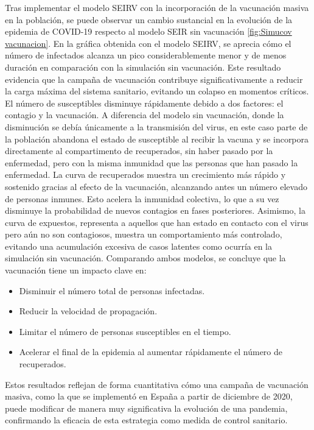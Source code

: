 Tras implementar el modelo SEIRV con la incorporación de la vacunación masiva en la población, se puede observar un cambio sustancial en la evolución de la epidemia de COVID-19 respecto al modelo SEIR sin vacunación \ref{fig:Simucov vacunacion}.
En la gráfica obtenida con el modelo SEIRV, se aprecia cómo el número de infectados alcanza un pico considerablemente menor y de menos duración en comparación con la simulación sin vacunación. Este resultado evidencia que la campaña de vacunación contribuye significativamente a reducir la carga máxima del sistema sanitario, evitando un colapso en momentos críticos.
El número de susceptibles disminuye rápidamente debido a dos factores: el contagio y la vacunación. A diferencia del modelo sin vacunación, donde la disminución se debía únicamente a la transmisión del virus, en este caso parte de la población abandona el estado de susceptible al recibir la vacuna y se incorpora directamente al compartimento de recuperados, sin haber pasado por la enfermedad, pero con la misma inmunidad que las personas que han pasado la enfermedad.
La curva de recuperados muestra un crecimiento más rápido y sostenido gracias al efecto de la vacunación, alcanzando antes un número elevado de personas inmunes. Esto acelera la inmunidad colectiva, lo que a su vez disminuye la probabilidad de nuevos contagios en fases posteriores.
Asimismo, la curva de expuestos, representa a aquellos que han estado en contacto con el virus pero aún no son contagiosos, muestra un comportamiento más controlado, evitando una acumulación excesiva de casos latentes como ocurría en la simulación sin vacunación.
Comparando ambos modelos, se concluye que la vacunación tiene un impacto clave en:
\begin{itemize}
    \item Disminuir el número total de personas infectadas.
    \item Reducir la velocidad de propagación.
    \item Limitar el número de personas susceptibles en el tiempo.
    \item Acelerar el final de la epidemia al aumentar rápidamente el número de recuperados.
\end{itemize}	
Estos resultados reflejan de forma cuantitativa cómo una campaña de vacunación masiva, como la que se implementó en España a partir de diciembre de 2020, puede modificar de manera muy significativa la evolución de una pandemia, confirmando la eficacia de esta estrategia como medida de control sanitario.



